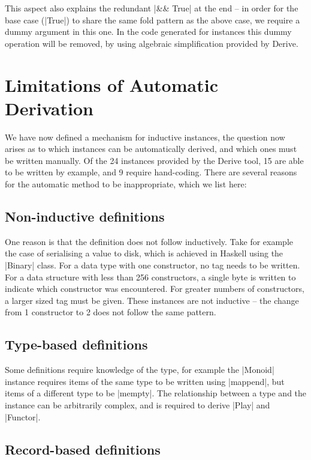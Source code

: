\documentclass{llncs}
\begin{document}
This aspect also explains the redundant |&& True| at the end -- in order for the base case (|True|) to share the same fold pattern as the above case, we require a dummy argument in this one. In the code generated for instances this dummy operation will be removed, by using algebraic simplification provided by Derive.


\section{Limitations of Automatic Derivation}
\label{sec:automatic_failure}

We have now defined a mechanism for inductive instances, the question now arises as to which instances can be automatically derived, and which ones must be written manually. Of the 24 instances provided by the Derive tool, 15 are able to be written by example, and 9 require hand-coding. There are several reasons for the automatic method to be inappropriate, which we list here:

\subsection{Non-inductive definitions}

One reason is that the definition does not follow inductively. Take for example the case of serialising a value to disk, which is achieved in Haskell using the |Binary| class. For a data type with one constructor, no tag needs to be written. For a data structure with less than 256 constructors, a single byte is written to indicate which constructor was encountered. For greater numbers of constructors, a larger sized tag must be given. These instances are not inductive -- the change from 1 constructor to 2 does not follow the same pattern.

\subsection{Type-based definitions}

Some definitions require knowledge of the type, for example the |Monoid| instance requires items of the same type to be written using |mappend|, but items of a different type to be |mempty|. The relationship between a type and the instance can be arbitrarily complex, and is required to derive |Play| and |Functor|.

\subsection{Record-based definitions}
\end{document}
